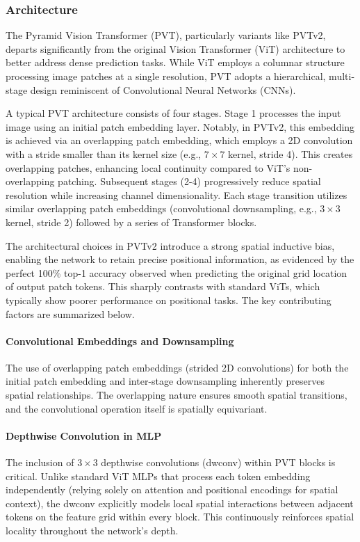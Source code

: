\documentclass[10pt]{article} %
\begin{document}
\subsubsection{Architecture}

The Pyramid Vision Transformer (PVT), particularly variants like PVTv2, departs significantly from the original Vision Transformer (ViT) architecture to better address dense prediction tasks. While ViT employs a columnar structure processing image patches at a single resolution, PVT adopts a hierarchical, multi-stage design reminiscent of Convolutional Neural Networks (CNNs).

A typical PVT architecture consists of four stages. Stage 1 processes the input image using an initial patch embedding layer. Notably, in PVTv2, this embedding is achieved via an overlapping patch embedding, which employs a 2D convolution with a stride smaller than its kernel size (e.g., $7\times7$ kernel, stride 4). This creates overlapping patches, enhancing local continuity compared to ViT's non-overlapping patching. Subsequent stages (2-4) progressively reduce spatial resolution while increasing channel dimensionality. Each stage transition utilizes similar overlapping patch embeddings (convolutional downsampling, e.g., $3\times3$ kernel, stride 2) followed by a series of Transformer blocks.

The architectural choices in PVTv2 introduce a strong spatial inductive bias, enabling the network to retain precise positional information, as evidenced by the perfect 100\% top-1 accuracy observed when predicting the original grid location of output patch tokens. This sharply contrasts with standard ViTs, which typically show poorer performance on positional tasks. The key contributing factors are summarized below.

\paragraph{Convolutional Embeddings and Downsampling} The use of overlapping patch embeddings (strided 2D convolutions) for both the initial patch embedding and inter-stage downsampling inherently preserves spatial relationships. The overlapping nature ensures smooth spatial transitions, and the convolutional operation itself is spatially equivariant.

\paragraph{Depthwise Convolution in MLP} The inclusion of $3\times3$ depthwise convolutions (dwconv) within PVT blocks is critical. Unlike standard ViT MLPs that process each token embedding independently (relying solely on attention and positional encodings for spatial context), the dwconv explicitly models local spatial interactions between adjacent tokens on the feature grid within every block. This continuously reinforces spatial locality throughout the network's depth.
\end{document}

